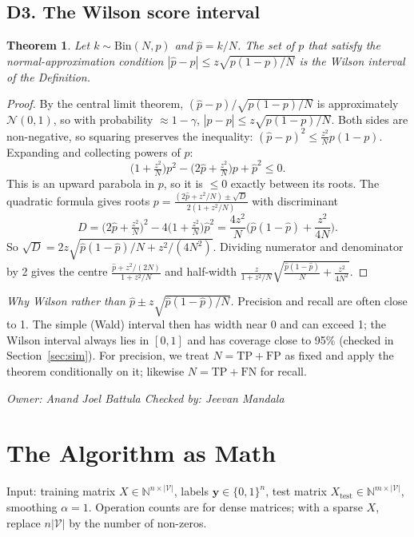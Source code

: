 \documentclass[11pt]{article}
\newcommand{\owner}[2]{\par\noindent\textit{Owner: #1 \hfill Checked by: #2}\par\medskip}
\theoremstyle{plain}
\newtheorem{theorem}{Theorem}
\theoremstyle{definition}
\newcommand{\N}{\mathbb{N}}
\newcommand{\Vs}{|\mathcal{V}|}
\begin{document}
\subsection{D3. The Wilson score interval}\label{sec:wilson}
\begin{theorem}\label{thm:wilson}
Let $k\sim\mathrm{Bin}(N,p)$ and $\hat p=k/N$. The set of $p$ that satisfy the normal-approximation
condition $|\hat p-p|\le z\sqrt{p(1-p)/N}$ is the Wilson interval of the Definition.
\end{theorem}
\begin{proof}
By the central limit theorem, $(\hat p-p)/\sqrt{p(1-p)/N}$ is approximately $\mathcal N(0,1)$, so
with probability $\approx1-\gamma$, $|\hat p-p|\le z\sqrt{p(1-p)/N}$. Both sides are
non-negative, so squaring preserves the inequality:
$(\hat p-p)^2\le\frac{z^2}{N}p(1-p)$. Expanding and collecting powers of $p$:
\[
\Big(1+\tfrac{z^2}{N}\Big)p^2-\Big(2\hat p+\tfrac{z^2}{N}\Big)p+\hat p^2\le0.
\]
This is an upward parabola in $p$, so it is $\le0$ exactly between its roots. The quadratic
formula gives roots $p=\frac{(2\hat p+z^2/N)\pm\sqrt{D}}{2(1+z^2/N)}$ with discriminant
\[
D=\Big(2\hat p+\tfrac{z^2}{N}\Big)^2-4\Big(1+\tfrac{z^2}{N}\Big)\hat p^2
=\frac{4z^2}{N}\Big(\hat p(1-\hat p)+\frac{z^2}{4N}\Big).
\]
So $\sqrt D=2z\sqrt{\hat p(1-\hat p)/N+z^2/(4N^2)}$. Dividing numerator and denominator by 2
gives the centre $\frac{\hat p+z^2/(2N)}{1+z^2/N}$ and half-width
$\frac{z}{1+z^2/N}\sqrt{\frac{\hat p(1-\hat p)}{N}+\frac{z^2}{4N^2}}$.
\end{proof}
\noindent\emph{Why Wilson rather than $\hat p\pm z\sqrt{\hat p(1-\hat p)/N}$.} Precision and
recall are often close to 1. The simple (Wald) interval then has width near 0 and can exceed 1;
the Wilson interval always lies in $[0,1]$ and has coverage close to 95\% (checked in
Section~\ref{sec:sim}). For precision, we treat $N=\mathrm{TP}+\mathrm{FP}$ as fixed and apply the
theorem conditionally on it; likewise $N=\mathrm{TP}+\mathrm{FN}$ for recall.
\owner{Anand Joel Battula}{Jeevan Mandala}

\section{The Algorithm as Math}\label{sec:algorithm}
Input: training matrix $X\in\N^{n\times\Vs}$, labels $\mathbf y\in\{0,1\}^n$, test matrix
$X_{\text{test}}\in\N^{m\times\Vs}$, smoothing $\alpha=1$. Operation counts are for dense
matrices; with a sparse $X$, replace $n\Vs$ by the number of non-zeros.
\end{document}
